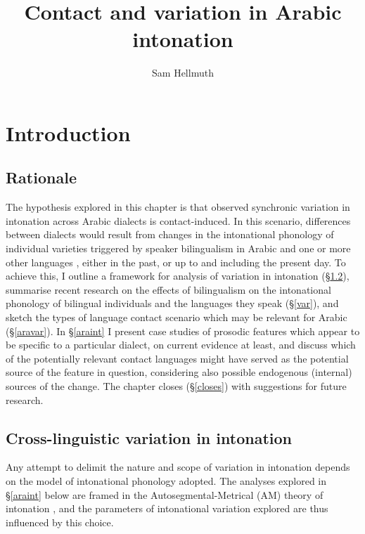 \documentclass[output=paper]{langsci/langscibook}
\author{Sam Hellmuth\affiliation{University of York}}
\title{Contact and variation in Arabic intonation}
\begin{document}
\maketitle 
 
 

 \section{Introduction}


 \subsection{Rationale}


The hypothesis explored in this chapter is that observed synchronic variation in intonation across Arabic dialects is contact-induced. In this scenario, differences between dialects would result from changes in the intonational phonology of individual varieties triggered by speaker bilingualism in Arabic and one or more other languages \citep{Lucas2015}, either in the past, or up to and including the present day. To achieve this, I outline a framework for analysis of variation in intonation (§\ref{cross}), summarise recent research on the effects of bilingualism on the intonational phonology of bilingual individuals and the languages they speak (§\ref{var}), and sketch the types of language contact scenario which may be relevant for Arabic (§\ref{aravar}). In §\ref{araint} I present case studies of prosodic features which appear to be specific to a particular dialect, on current evidence at least, and discuss which of the potentially relevant contact languages might have served as the potential source of the feature in question, considering also possible endogenous (internal) sources of the change. The chapter closes (§\ref{closes}) with suggestions for future research.


 
 \subsection{Cross-linguistic variation in intonation} \label{cross}


Any attempt to delimit the nature and scope of variation in intonation depends on the model of intonational phonology adopted. The analyses explored in §\ref{araint} below are framed in the Autosegmental-Metrical (AM) theory of intonation \citep{Ladd2008}, and the parameters of intonational variation explored are thus influenced by this choice. 
\end{document}

